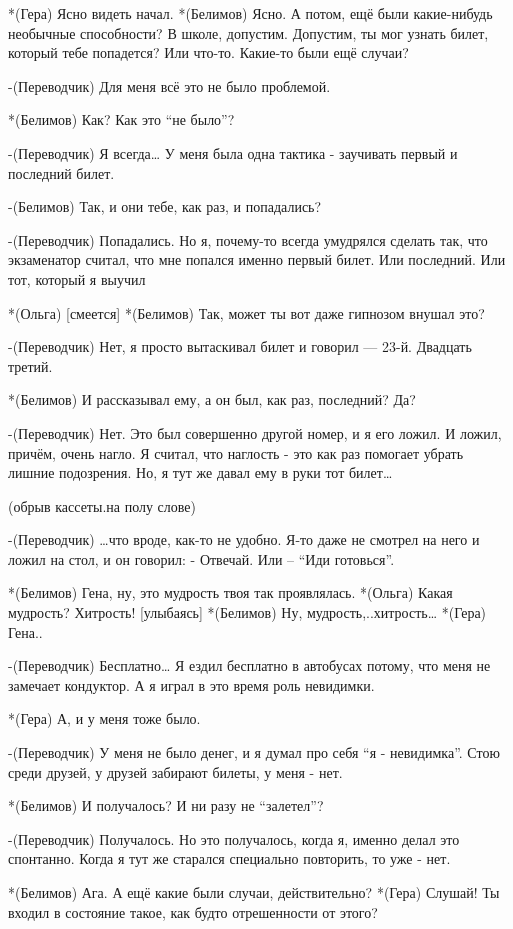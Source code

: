 *(Гера) Ясно видеть начал.
*(Белимов) Ясно. А потом, ещё были какие-нибудь необычные способности? В школе, допустим. Допустим, ты мог узнать билет, который тебе попадется? Или что-то. Какие-то были ещё случаи?

-(Переводчик) Для меня всё это не было проблемой.

*(Белимов) Как? Как это “не было”?

-(Переводчик) Я всегда… У меня была одна тактика - заучивать первый и последний билет.

-(Белимов) Так, и они тебе, как раз, и попадались?

-(Переводчик) Попадались. Но я, почему-то всегда умудрялся сделать так, что экзаменатор считал, что мне попался именно первый билет. Или последний. Или тот, который я выучил

*(Ольга) [смеется]
*(Белимов) Так, может ты вот даже гипнозом внушал это?

-(Переводчик) Нет, я просто вытаскивал билет и говорил — 23-й. Двадцать третий.

*(Белимов) И рассказывал ему, а он был, как раз, последний? Да?

-(Переводчик) Нет. Это был совершенно другой номер, и я его ложил. И ложил, причём,  очень нагло. Я считал, что наглость - это как раз помогает убрать лишние подозрения. Но, я тут же давал ему в руки тот билет…

(обрыв кассеты.на полу слове)

-(Переводчик) …что вроде, как-то не удобно. Я-то даже не смотрел на него и ложил на стол, и он говорил: - Отвечай. Или – “Иди готовься”.

*(Белимов) Гена, ну, это мудрость твоя так проявлялась.
*(Ольга) Какая мудрость? Хитрость! [улыбаясь]
*(Белимов) Ну, мудрость,..хитрость…
*(Гера) Гена.. 

-(Переводчик) Бесплатно… Я ездил бесплатно в автобусах потому, что меня не замечает кондуктор. А я играл в это время роль невидимки.

*(Гера) А, и у меня тоже было.

-(Переводчик) У меня не было денег, и я думал про себя “я - невидимка”. Стою среди друзей, у друзей забирают билеты, у меня - нет. 

*(Белимов) И получалось? И ни разу не “залетел”?

-(Переводчик) Получалось. Но это получалось, когда я, именно делал это спонтанно. Когда я тут же старался  специально повторить, то уже - нет. 

*(Белимов) Ага. А ещё какие были случаи, действительно?
*(Гера) Слушай! Ты входил в состояние такое, как будто отрешенности от этого?

